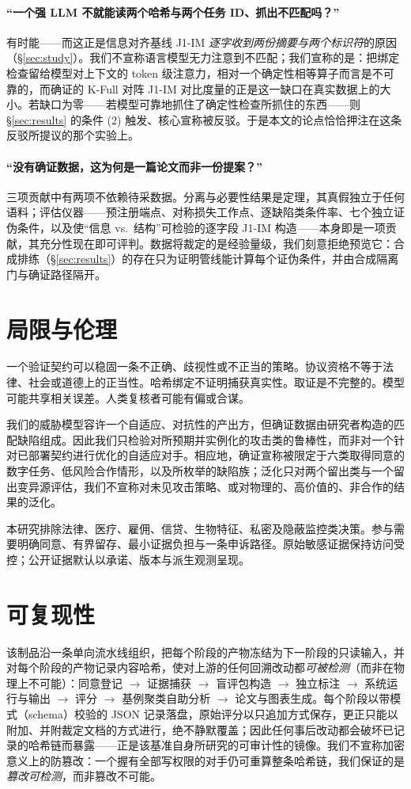 \documentclass[11pt]{ctexart}
\begin{document}
\paragraph{“一个强 LLM 不就能读两个哈希与两个任务 ID、抓出不匹配吗？”} 有时能——而这正是信息对齐基线 J1-IM \emph{逐字收到两份摘要与两个标识符}的原因（\S\ref{sec:study}）。我们不宣称语言模型无力注意到不匹配；我们宣称的是：把绑定检查留给模型对上下文的 token 级注意力，相对一个确定性相等算子而言是不可靠的，而确证的 K-Full 对阵 J1-IM 对比度量的正是这一缺口在真实数据上的大小。若缺口为零——若模型可靠地抓住了确定性检查所抓住的东西——则 \S\ref{sec:results} 的条件 (2) 触发、核心宣称被反驳。于是本文的论点恰恰押注在这条反驳所提议的那个实验上。

\paragraph{“没有确证数据，这为何是一篇论文而非一份提案？”} 三项贡献中有两项不依赖待采数据。分离与必要性结果是定理，其真假独立于任何语料；评估仪器——预注册端点、对称损失工作点、逐缺陷类条件率、七个独立证伪条件，以及使“信息 vs.\ 结构”可检验的逐字段 J1-IM 构造——本身即是一项贡献，其充分性现在即可评判。数据将裁定的是经验量级，我们刻意拒绝预览它：合成排练（\S\ref{sec:results}）的存在只为证明管线能计算每个证伪条件，并由合成隔离门与确证路径隔开。

\section{局限与伦理}
\label{sec:limitations}
一个验证契约可以稳固一条不正确、歧视性或不正当的策略。协议资格不等于法律、社会或道德上的正当性。哈希绑定不证明捕获真实性。取证是不完整的。模型可能共享相关误差。人类复核者可能有偏或合谋。

我们的威胁模型容许一个自适应、对抗性的产出方，但确证数据由研究者构造的匹配缺陷组成。因此我们只检验对所预期并实例化的攻击类的鲁棒性，而非对一个针对已部署契约进行优化的自适应对手。相应地，确证宣称被限定于六类取得同意的数字任务、低风险合作情形，以及所枚举的缺陷族；泛化只对两个留出类与一个留出变异源评估，我们不宣称对未见攻击策略、或对物理的、高价值的、非合作的结果的泛化。

本研究排除法律、医疗、雇佣、信贷、生物特征、私密及隐蔽监控类决策。参与需要明确同意、有界留存、最小证据负担与一条申诉路径。原始敏感证据保持访问受控；公开证据默认以承诺、版本与派生观测呈现。

\section{可复现性}
该制品沿一条单向流水线组织，把每个阶段的产物冻结为下一阶段的只读输入，并对每个阶段的产物记录内容哈希，使对上游的任何回溯改动都\emph{可被检测}（而非在物理上不可能）：同意登记 $\to$ 证据捕获 $\to$ 盲评包构造 $\to$ 独立标注 $\to$ 系统运行与输出 $\to$ 评分 $\to$ 基例聚类自助分析 $\to$ 论文与图表生成。每个阶段以带模式（schema）校验的 JSON 记录落盘，原始评分以只追加方式保存，更正只能以附加、并附裁定文档的方式进行，绝不静默覆盖；因此任何事后改动都会破坏已记录的哈希链而暴露——正是该基准自身所研究的可审计性的镜像。我们不宣称加密意义上的防篡改：一个握有全部写权限的对手仍可重算整条哈希链，我们保证的是\emph{篡改可检测}，而非篡改不可能。
\end{document}
